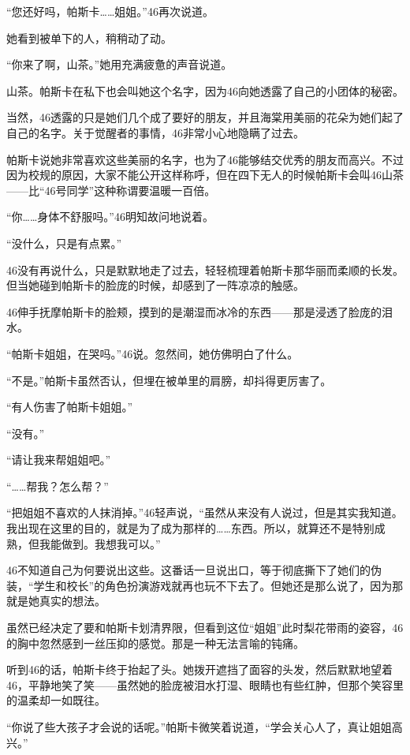 “您还好吗，帕斯卡……姐姐。”46再次说道。

她看到被单下的人，稍稍动了动。

“你来了啊，山茶。”她用充满疲惫的声音说道。

山茶。帕斯卡在私下也会叫她这个名字，因为46向她透露了自己的小团体的秘密。

当然，46透露的只是她们几个成了要好的朋友，并且海棠用美丽的花朵为她们起了自己的名字。关于觉醒者的事情，46非常小心地隐瞒了过去。

帕斯卡说她非常喜欢这些美丽的名字，也为了46能够结交优秀的朋友而高兴。不过因为校规的原因，大家不能公开这样称呼，但在四下无人的时候帕斯卡会叫46山茶——比“46号同学”这种称谓要温暖一百倍。

“你……身体不舒服吗。”46明知故问地说着。

“没什么，只是有点累。”

46没有再说什么，只是默默地走了过去，轻轻梳理着帕斯卡那华丽而柔顺的长发。但当她碰到帕斯卡的脸庞的时候，却感到了一阵凉凉的触感。

46伸手抚摩帕斯卡的脸颊，摸到的是潮湿而冰冷的东西——那是浸透了脸庞的泪水。

“帕斯卡姐姐，在哭吗。”46说。忽然间，她仿佛明白了什么。

“不是。”帕斯卡虽然否认，但埋在被单里的肩膀，却抖得更厉害了。

“有人伤害了帕斯卡姐姐。”

“没有。”

“请让我来帮姐姐吧。”

“……帮我？怎么帮？”

“把姐姐不喜欢的人抹消掉。”46轻声说，“虽然从来没有人说过，但是其实我知道。我出现在这里的目的，就是为了成为那样的……东西。所以，就算还不是特别成熟，但我能做到。我想我可以。”

46不知道自己为何要说出这些。这番话一旦说出口，等于彻底撕下了她们的伪装，“学生和校长”的角色扮演游戏就再也玩不下去了。但她还是那么说了，因为那就是她真实的想法。

虽然已经决定了要和帕斯卡划清界限，但看到这位“姐姐”此时梨花带雨的姿容，46的胸中忽然感到一丝压抑的感觉。那是一种无法言喻的钝痛。

听到46的话，帕斯卡终于抬起了头。她拨开遮挡了面容的头发，然后默默地望着46，平静地笑了笑——虽然她的脸庞被泪水打湿、眼睛也有些红肿，但那个笑容里的温柔却一如既往。

“你说了些大孩子才会说的话呢。”帕斯卡微笑着说道，“学会关心人了，真让姐姐高兴。”

\section*{}

